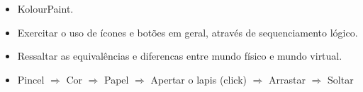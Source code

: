 \begin{itemize}
	\item KolourPaint.
	\item Exercitar o uso de ícones e botões em geral, através de sequenciamento lógico.
	\item Ressaltar as equivalências e diferencas entre mundo físico e mundo virtual.
	\item Pincel $\Rightarrow$ Cor $\Rightarrow$ Papel $\Rightarrow$ Apertar o lapis (click) $\Rightarrow$ Arrastar $\Rightarrow$ Soltar
\end{itemize}